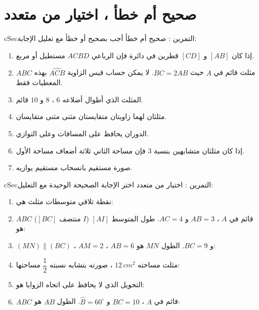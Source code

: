 \documentclass[12pt,a4paper]{article}
\newenvironment{BOX}[2]{\begin{otherlanguage}{english}\begin{arbox}{#1}{#2}}{\end{arbox}\end{otherlanguage}}
\newcounter{exo}
\newenvironment{tamrin}[1]{\stepcounter{exo}\begin{BOX}{cSec}{التمرين \theexo: #1}}{\end{BOX}}
\begin{document}
\section{صحيح أم خطأ ، اختيار من متعدد}
\begin{tamrin}{صحيح أم خطأ}
أجب بصحيح أو خطأ مع تعليل الإجابة:
\begin{enumerate}
\item إذا كان $[AB]$ و $[CD]$ قطرين في دائرة فإن الرباعي $ACBD$ مستطيل أو مربع.
\item $ABC$ مثلث قائم في $A$ حيث $BC=2AB$. لا يمكن حساب قيس الزاوية $\widehat{ACB}$ بهذه المعطيات فقط.
\item المثلث الذي أطوال أضلاعه $6$ ، $8$ و $10$ قائم.
\item مثلثان لهما زاويتان متقايستان مثنى مثنى متقايسان.
\item الدوران يحافظ على المسافات وعلى التوازي.
\item إذا كان مثلثان متشابهين بنسبة $3$ فإن مساحة الثاني ثلاثة أضعاف مساحة الأول.
\item صورة مستقيم بانسحاب مستقيم يوازيه.
\end{enumerate}
\end{tamrin}

\begin{tamrin}{اختيار من متعدد}
اختر الإجابة الصحيحة الوحيدة مع التعليل:
\begin{enumerate}
\item نقطة تلاقي متوسطات مثلث هي:
\item $ABC$ قائم في $A$ ، $AB=3$ و $AC=4$. طول المتوسط $[AI]$ ($I$ منتصف $[BC]$) هو:
\item $(MN)\parallel(BC)$ ، $AM=2$ ، $AB=6$ و $BC=9$. الطول $MN$ هو:
\item مثلث مساحته $12\,cm^2$ ، صورته بتشابه نسبته $\dfrac12$ مساحتها:
\item التحويل الذي لا يحافظ على اتجاه الزوايا هو:
\item $ABC$ قائم في $A$ ، $BC=10$ و $\widehat B=60^\circ$. الطول $AB$ هو:
\end{enumerate}
\end{tamrin}
\end{document}

